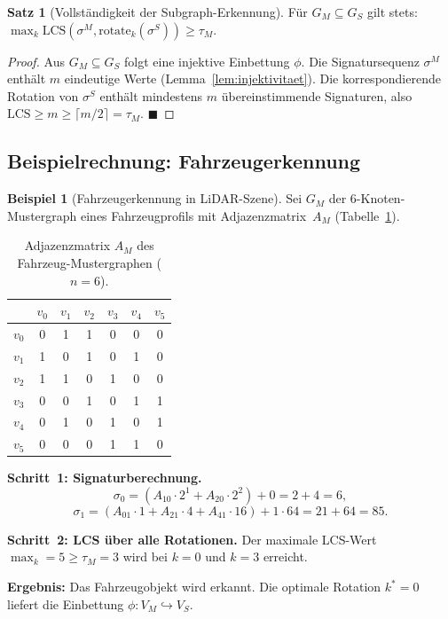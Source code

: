 ﻿\documentclass[a4paper,12pt]{article}
\theoremstyle{definition}
\newtheorem{beispiel}{Beispiel}[section]
\newtheorem{satz}{Satz}[section]
\begin{document}
\begin{satz}[Vollständigkeit der Subgraph-Erkennung]
  \label{satz:vollstaendigkeit}
  Für $G_M \subseteq G_S$ gilt stets:
  $\max_{k} \mathrm{LCS}(\sigma^M, \mathrm{rotate}_k(\sigma^S))
  \geq \tau_M$.
\end{satz}

\begin{proof}
  Aus $G_M \subseteq G_S$ folgt eine injektive Einbettung $\phi$.
  Die Signatursequenz $\sigma^M$ enthält $m$ eindeutige Werte
  (Lemma~\ref{lem:injektivitaet}). Die korrespondierende Rotation
  von $\sigma^S$ enthält mindestens $m$ übereinstimmende Signaturen,
  also $\mathrm{LCS} \geq m \geq \lceil m/2 \rceil = \tau_M$.
  \hfill$\blacksquare$
\end{proof}

\subsection{Beispielrechnung: Fahrzeugerkennung}

\begin{beispiel}[Fahrzeugerkennung in LiDAR-Szene]
  \label{bsp:fahrzeug}
  Sei $G_M$ der 6-Knoten-Mustergraph eines Fahrzeugprofils mit
  Adjazenzmatrix~$A_M$ (Tabelle~\ref{tab:adjazenz}).

  \begin{table}[htbp]
    \centering
    \caption{Adjazenzmatrix $A_M$ des Fahrzeug-Mustergraphen ($n=6$).}
    \label{tab:adjazenz}
    \begin{tabular}{@{}ccccccc@{}}
      \toprule
         & $v_0$ & $v_1$ & $v_2$ & $v_3$ & $v_4$ & $v_5$ \\
      \midrule
      $v_0$ & 0 & 1 & 1 & 0 & 0 & 0 \\
      $v_1$ & 1 & 0 & 1 & 0 & 1 & 0 \\
      $v_2$ & 1 & 1 & 0 & 1 & 0 & 0 \\
      $v_3$ & 0 & 0 & 1 & 0 & 1 & 1 \\
      $v_4$ & 0 & 1 & 0 & 1 & 0 & 1 \\
      $v_5$ & 0 & 0 & 0 & 1 & 1 & 0 \\
      \bottomrule
    \end{tabular}
  \end{table}

  \textbf{Schritt~1: Signaturberechnung.}
  \[
    \sigma_0 = (A_{10}\cdot 2^1 + A_{20}\cdot 2^2) + 0 = 2+4 = 6,
  \]
  \[
    \sigma_1 = (A_{01}\cdot 1 + A_{21}\cdot 4 + A_{41}\cdot 16)
               + 1 \cdot 64 = 21 + 64 = 85.
  \]

  \textbf{Schritt~2: LCS über alle Rotationen.}
  Der maximale LCS-Wert $\max_k = 5 \geq \tau_M = 3$ wird
  bei $k = 0$ und $k = 3$ erreicht.

  \textbf{Ergebnis:} Das Fahrzeugobjekt wird erkannt.
  Die optimale Rotation $k^* = 0$ liefert die Einbettung
  $\phi: V_M \hookrightarrow V_S$.
\end{beispiel}
\end{document}
